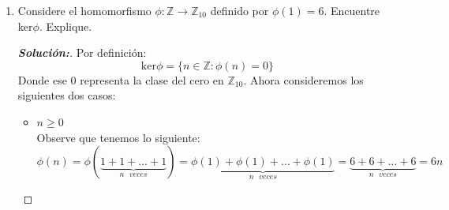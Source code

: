 \documentclass[12pt]{article}
\begin{document}
\begin{enumerate}
\begin{proof}[\textbf{Cero. Justificación:}]
    \begin{align*}
        |S_3/\text{ker}\phi|&=|\mathbb{Z}_5|\\
        \frac{|S_3|}{|\text{ker}\phi|}&=|\mathbb{Z}_5|\\
        \frac{6}{|\text{ker}\phi|}&=5
    \end{align*}
     Para que eso se cumpliera se debería de tener que $|\text{ker}\phi|=\frac{6}{5}$ pero esto es absurdo, entonces no puede existir $\phi$ homomorfismo sobreyectivo.
    \end{proof}
    \item Considere el homomorfismo $\phi:\mathbb{Z}\to\mathbb{Z}_{10}$ definido por $\phi(1)=6$. Encuentre ker$\phi$. Explique.
    \begin{proof}[\textbf{Solución:}]
    Por definición:
    $$\text{ker}\phi=\{n\in\mathbb{Z}:\phi(n)=0\}$$
    Donde ese $0$ representa la clase del cero en $\mathbb{Z}_{10}$. Ahora consideremos los siguientes dos casos:
    \begin{itemize}
        \item $n\geq0$\\
        Observe que tenemos lo siguiente:
            $$\phi(n)=\phi(\underbrace{1+1+\dots+1}_{n\text{ } veces})=\underbrace{\phi(1)+\phi(1)+\dots+\phi(1)}_{n\text{ } veces}=\underbrace{6+6+\dots+6}_{n\text{ }veces}=6n$$
        

\end{itemize}
\end{proof}
\end{enumerate}
\end{document}
